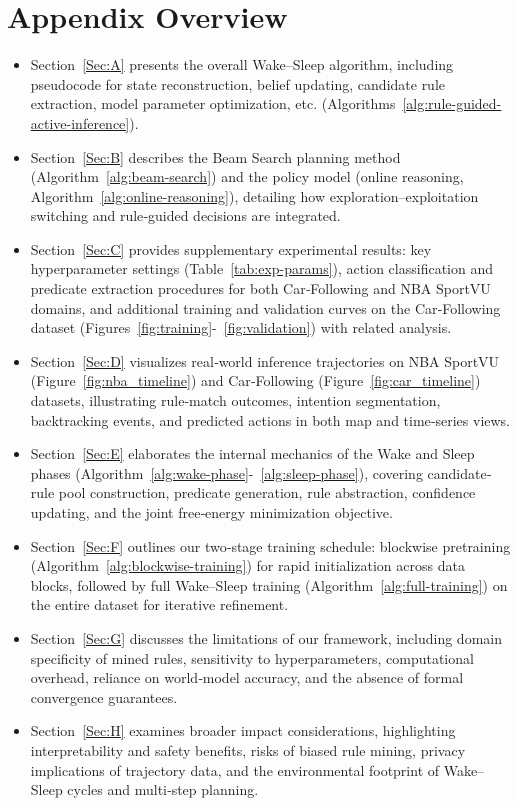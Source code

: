 \documentclass{article} %
\begin{document}
\iffalse
\newpage
\appendix

\section*{Appendix Overview}
\begin{itemize}
  \item Section~\ref{Sec:A} presents the overall Wake–Sleep algorithm, including pseudocode for state reconstruction, belief updating, candidate rule extraction, model parameter optimization, etc. (Algorithms~\ref{alg:rule-guided-active-inference}).
  \item Section~\ref{Sec:B} describes the Beam Search planning method (Algorithm~\ref{alg:beam-search}) and the policy model (online reasoning, Algorithm~\ref{alg:online-reasoning}), detailing how exploration–exploitation switching and rule‐guided decisions are integrated.
  \item Section~\ref{Sec:C} provides supplementary experimental results: key hyperparameter settings (Table~\ref{tab:exp-params}), action classification and predicate extraction procedures for both Car‐Following and NBA SportVU domains, and additional training and validation curves on the Car‐Following dataset (Figures~\ref{fig:training}-~\ref{fig:validation}) with related analysis.
  \item Section~\ref{Sec:D} visualizes real‐world inference trajectories on NBA SportVU (Figure~\ref{fig:nba_timeline}) and Car‐Following (Figure~\ref{fig:car_timeline}) datasets, illustrating rule‐match outcomes, intention segmentation, backtracking events, and predicted actions in both map and time‐series views.
  \item Section~\ref{Sec:E} elaborates the internal mechanics of the Wake and Sleep phases (Algorithm~\ref{alg:wake-phase}-~\ref{alg:sleep-phase}), covering candidate‐rule pool construction, predicate generation, rule abstraction, confidence updating, and the joint free‐energy minimization objective.
  \item Section~\ref{Sec:F} outlines our two‐stage training schedule: blockwise pretraining (Algorithm~\ref{alg:blockwise-training}) for rapid initialization across data blocks, followed by full Wake–Sleep training (Algorithm~\ref{alg:full-training}) on the entire dataset for iterative refinement.
  \item Section~\ref{Sec:G} discusses the limitations of our framework, including domain specificity of mined rules, sensitivity to hyperparameters, computational overhead, reliance on world‐model accuracy, and the absence of formal convergence guarantees.
  \item Section~\ref{Sec:H} examines broader impact considerations, highlighting interpretability and safety benefits, risks of biased rule mining, privacy implications of trajectory data, and the environmental footprint of Wake–Sleep cycles and multi‐step planning.
\end{itemize}
\end{document}

